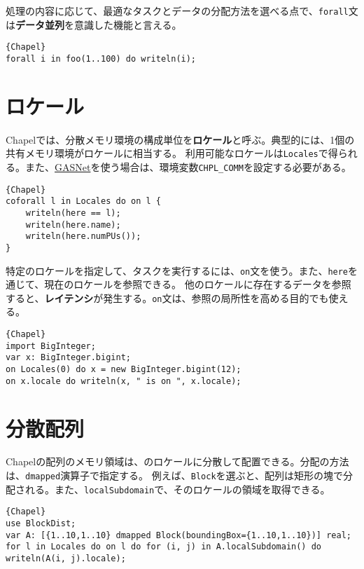 \documentclass[10pt,a4paper]{book}
\begin{document}
処理の内容に応じて、最適なタスクとデータの分配方法を選べる点で、\texttt{forall}文は\textbf{データ並列}を意識した機能と言える。

\begin{Verbatim}{Chapel}
forall i in foo(1..100) do writeln(i);
\end{Verbatim}

\section{ロケール\label{sect:locale}}

Chapelでは、分散メモリ環境の構成単位を\textbf{ロケール}と呼ぶ。典型的には、1個の共有メモリ環境がロケールに相当する。
利用可能なロケールは\texttt{Locales}で得られる。また、\href{https://gasnet.lbl.gov}{GASNet}を使う場合は、環境変数\verb|CHPL_COMM|を設定する必要がある。

\begin{Verbatim}{Chapel}
coforall l in Locales do on l {
	writeln(here == l);
	writeln(here.name);
	writeln(here.numPUs());
}
\end{Verbatim}

特定のロケールを指定して、タスクを実行するには、\texttt{on}文を使う。また、\texttt{here}を通じて、現在のロケールを参照できる。
他のロケールに存在するデータを参照すると、\textbf{レイテンシ}が発生する。\texttt{on}文は、参照の局所性を高める目的でも使える。

\begin{Verbatim}{Chapel}
import BigInteger;
var x: BigInteger.bigint;
on Locales(0) do x = new BigInteger.bigint(12);
on x.locale do writeln(x, " is on ", x.locale);
\end{Verbatim}

\section{分散配列}

Chapelの配列のメモリ領域は、のロケールに分散して配置できる。分配の方法は、\texttt{dmapped}演算子で指定する。
例えば、\texttt{Block}を選ぶと、配列は矩形の塊で分配される。また、\texttt{localSubdomain}で、そのロケールの領域を取得できる。

\begin{Verbatim}{Chapel}
use BlockDist;
var A: [{1..10,1..10} dmapped Block(boundingBox={1..10,1..10})] real;
for l in Locales do on l do for (i, j) in A.localSubdomain() do writeln(A(i, j).locale);
\end{Verbatim}
\end{document}
